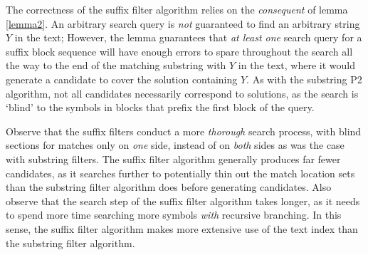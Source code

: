 The correctness of the suffix filter algorithm relies on the \textit{consequent} of lemma \ref{lemma2}. An arbitrary search query is \textit{not} guaranteed to find an arbitrary string $Y$ in the text; However, the lemma guarantees that \textit{at least one} search query for a suffix block sequence will have enough errors to spare throughout the search all the way to the end of the matching substring with $Y$ in the text, where it would generate a candidate to cover the \gls{solution} containing $Y$. As with the substring P2 algorithm, not all candidates necessarily correspond to solutions, as the search is `blind' to the symbols in blocks that prefix the first block of the query.
 
Observe that the suffix filters conduct a more \textit{thorough} search process, with blind sections for matches only on \textit{one} side, instead of on \textit{both} sides as was the case with substring filters. The suffix filter algorithm generally produces far fewer candidates, as it searches further to potentially thin out the match location sets than the substring filter algorithm does before generating candidates. Also observe that the \gls{search step} of the suffix filter algorithm takes longer, as it needs to spend more time searching more symbols \textit{with} recursive branching. In this sense, the suffix filter algorithm makes more extensive use of the text index than the substring filter algorithm.